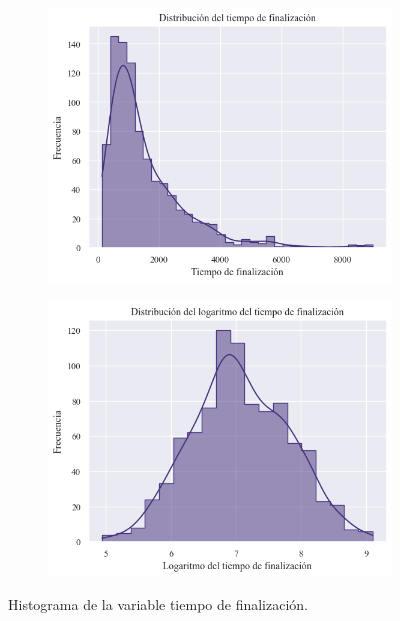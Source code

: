 \documentclass[a4paper, 12pt]{article}
\begin{document}
	\begin{figure}[htb!]
		\centering
		\begin{subfigure}{.45\linewidth}
			\includegraphics[height=.95\linewidth, width=.95\linewidth]{assets/time_dist}
			\caption{}
			\label{fig:1a}
		\end{subfigure}
		\begin{subfigure}{.45\linewidth}
			\includegraphics[height=.95\linewidth, width=.95\linewidth]{assets/log_time_dist}
			\caption{}
			\label{fig:1b}
		\end{subfigure}
		\caption{Histograma de la variable tiempo de finalización.}
		\label{fig:1}
	\end{figure}
	
\end{document}
